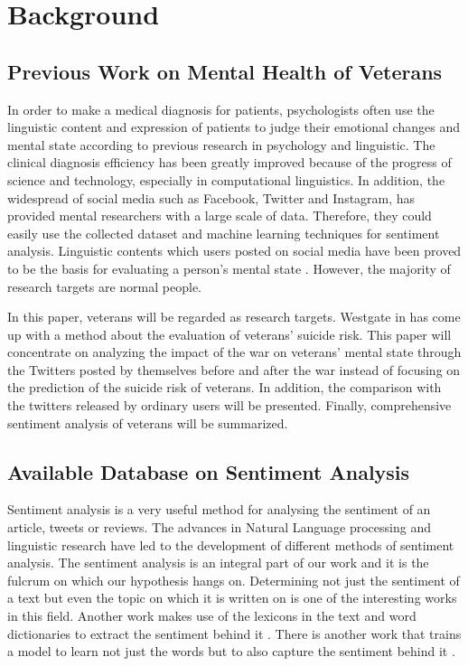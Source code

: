\section{Background}

\subsection{Previous Work on Mental Health of Veterans}

In order to make a medical diagnosis for patients, psychologists often use the
linguistic content and expression of patients to judge their emotional changes
and mental state according to previous research in psychology and linguistic.
The clinical diagnosis efficiency has been greatly improved because of the
progress of science and technology, especially in computational linguistics.
In addition, the widespread of social media such as Facebook, Twitter and
Instagram, has provided mental researchers with a large scale of data.
Therefore, they could easily use the collected dataset and machine learning
techniques for sentiment analysis. Linguistic contents which users posted on
social media have been proved to be the basis for evaluating a person's mental
state \citep{becauseIwastoldsomuch} \citep{GUNTUKU201743}. However,
the majority of research targets are normal people.

In this paper, veterans will be regarded as research targets. Westgate in
\citep{doi:10.1176/appi.ps.201400283} has come up with a method about the evaluation
of veterans' suicide risk. This paper will concentrate on analyzing
the impact of the war on veterans' mental state through the Twitters posted by
themselves before and after the war instead of focusing on the prediction of
the suicide risk of veterans. In addition, the comparison with the twitters
released by ordinary users will be presented. Finally, comprehensive
sentiment analysis of veterans will be summarized.

\subsection{Available Database on Sentiment Analysis}

Sentiment analysis is a very useful method for analysing the sentiment of an
article, tweets or reviews. The advances in Natural Language processing and
linguistic research have led to the development of different methods of
sentiment analysis. The sentiment analysis is an integral part of our work and
it is the fulcrum on which our hypothesis hangs on. Determining not just the
sentiment of a text but even the topic \citep{10.1145/1645953.1646003} on which
it is written on is one of the interesting works in this field. Another work
makes use of the lexicons in the text and word dictionaries to extract the
sentiment behind it \citep{10.5555/2002472.2002491}. There is another work that
trains a model to learn not just the words but to also capture the sentiment
behind it \citep{taboada2011lexicon}.

